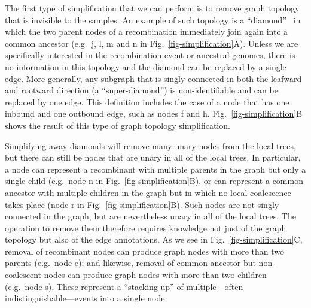 \documentclass{article}
\begin{document}
The first type of simplification that we can perform is to remove
graph topology that is invisible to the samples.
An example of such topology is a
``diamond''~\citep{rasmussen2014genome}
in which the two parent nodes of a recombination immediately
join again into a common ancestor (e.g.~\textsf{j}, \textsf{l}, \textsf{m}
and \textsf{n} in Fig.~\ref{fig-simplification}A).
Unless we are specifically
interested in the recombination event or ancestral genomes,
there is no information in this topology and the diamond can be
replaced by a single edge. More generally, any
subgraph that is singly-connected in both the leafward and
rootward direction (a ``super-diamond'') is non-identifiable and can be
replaced by one edge. This definition includes the case
of a node that has one inbound and one outbound edge, such as
nodes \textsf{f} and \textsf{h}.
Fig.~\ref{fig-simplification}B shows the result of this type of
graph topology simplification.

Simplifying away diamonds will remove many unary nodes from the
local trees, but there can still be nodes that are unary in all
of the local trees. In particular, a node can represent a recombinant
with multiple parents in the graph but only a single child (e.g.\ node \textsf{n}
in Fig.~\ref{fig-simplification}B), or can represent a common ancestor with
multiple children in the graph but in which no local coalescence takes place
(node \textsf{r} in Fig.~\ref{fig-simplification}B).
Such nodes are not singly connected in the graph, but are nevertheless unary in
all of the local trees.
The operation to remove them
therefore requires knowledge not just of the graph topology but also of the
edge annotations.
As we see in Fig.~\ref{fig-simplification}C,
removal of recombinant nodes can produce graph nodes with
more than two parents (e.g.~node \textsf{e}); and likewise, removal of
common ancestor but non-coalescent nodes can produce graph nodes with
more than two children (e.g.~node \textsf{s}). These represent a ``stacking up'' of
multiple---often indistinguishable---events into a single node.

\end{document}
